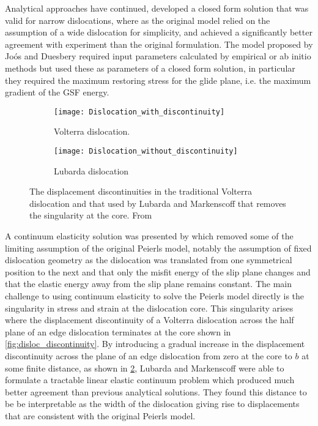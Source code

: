 Analytical approaches have continued, \citet{Joos1997} developed a closed form solution that was valid for narrow dislocations, where as the original model relied on the assumption of a wide dislocation for simplicity, and achieved a significantly better agreement with experiment than the original formulation. The model proposed by Joós and Duesbery required input parameters calculated by empirical or ab initio methods but used these as parameters of a closed form solution, in particular they required the maximum restoring stress for the glide plane, i.e. the maximum gradient of the GSF energy.

\begin{figure}
\centering
\begin{subfigure}{0.4\textwidth}
\centering
\texttt{[image: Dislocation\_with\_discontinuity]}
\caption{Volterra dislocation.\label{fig:disloc_discontinuity}}
\end{subfigure}%
\begin{subfigure}{0.4\textwidth}
\centering
\texttt{[image: Dislocation\_without\_discontinuity]}
\caption{Lubarda dislocation\label{fig:disloc_no_discontinuity}}
\end{subfigure}
\caption[Volterra and Lubarda dislocations.]{The displacement discontinuities in the traditional Volterra dislocation and that used by Lubarda and Markenscoff that removes the singularity at the core. From \cite{Lubarda2007}\label{fig:discontinuity}}
\end{figure}

A continuum elasticity solution was presented by \citet{Lubarda2007} which removed some of the limiting assumption of the original Peierls model, notably the assumption of fixed dislocation geometry as the dislocation was translated from one symmetrical position to the next and that only the misfit energy of the slip plane changes and that the elastic energy away from the slip plane remains constant. The main challenge to using continuum elasticity to solve the Peierls model directly is the singularity in stress and strain at the dislocation core. 
This singularity arises where the displacement discontinuity of a Volterra dislocation across the half plane of an edge dislocation terminates at the core shown in \autoref{fig:disloc_discontinuity}. 
By introducing a gradual increase in the displacement discontinuity across the plane of an edge dislocation from zero at the core to $b$ at some finite distance, as shown in \ref{fig:disloc_no_discontinuity}, Lubarda and Markenscoff were able to formulate a tractable linear elastic continuum problem which produced much better agreement than previous analytical solutions. They found this distance to be be interpretable as the width of the dislocation giving rise to displacements that are consistent with the original Peierls model. 



